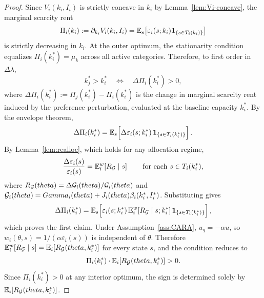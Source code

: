 \documentclass[master.tex]{subfiles}
\begin{document}
\begin{proof}
Since $V_i(k_i,I_i)$ is strictly concave in $k_i$ by Lemma~\ref{lem:Vi-concave}, the marginal scarcity rent
\[
\Pi_i(k_i):=\partial_{k_i}V_i(k_i,I_i)
=
\mathbb{E}_s\!\left[
\varepsilon_i(s;k_i)\mathbf{1}_{\{s\in T_i(k_i)\}}
\right]
\]
is strictly decreasing in $k_i$. At the outer optimum, the stationarity condition equalizes $\Pi_i(k_i^\ast)=\mu_k$ across all active categories. Therefore, to first order in $\Delta\lambda$,
\[
k_j^\ast>k_i^\ast
\quad\Longleftrightarrow\quad
\Delta \Pi_i(k_i^\ast)>0,
\]
where $\Delta \Pi_i(k_i^\ast):=\Pi_j(k_i^\ast)-\Pi_i(k_i^\ast)$ is the change in marginal scarcity rent induced by the preference perturbation, evaluated at the baseline capacity $k_i^\ast$. By the envelope theorem,
\[
\Delta \Pi_i(k_i^\ast)
=
\mathbb{E}_s\!\left[
\Delta \varepsilon_i(s;k_i^\ast)\,
\mathbf{1}_{\{s\in T_i(k_i^\ast)\}}
\right].
\]
By Lemma~\ref{lem:realloc}, which holds for any allocation regime,
\[
\frac{\Delta\varepsilon_i(s)}{\varepsilon_i(s)}
=
\mathbb{E}_i^w\!\left[R_{\mathcal{G}}\mid s\right]
\qquad
\text{for each } s\in T_i(k_i^\ast),
\]
where $R_{\mathcal{G}}(theta)=\Delta \mathcal{G}_i(theta)/\mathcal{G}_i(theta)$ and $\mathcal{G}_i(theta)=Gamma_i(theta)+J_i(theta)\beta_i(k_i^\ast,I_i^\ast)$. Substituting gives
\[
\Delta \Pi_i(k_i^\ast)
=
\mathbb{E}_s\!\left[
\varepsilon_i(s;k_i^\ast)\,
\mathbb{E}_i^w\!\left[R_{\mathcal{G}}\mid s;k_i^\ast\right]
\mathbf{1}_{\{s\in T_i(k_i^\ast)\}}
\right],
\]
which proves the first claim. Under Assumption~\ref{ass:CARA}, $u_q=-\alpha u$, so $w_i(\theta,s)=1/(\alpha\varepsilon_i(s))$ is independent of $\theta$. Therefore $\mathbb{E}_i^w[R_{\mathcal{G}}\mid s]=\mathbb{E}_i[R_{\mathcal{G}}(theta,k_i^\ast)]$ for every state $s$, and the condition reduces to
\[
\Pi_i(k_i^\ast)\cdot\mathbb{E}_i[R_{\mathcal{G}}(theta,k_i^\ast)]>0.
\]
Since $\Pi_i(k_i^\ast)>0$ at any interior optimum, the sign is determined solely by $\mathbb{E}_i[R_{\mathcal{G}}(theta,k_i^\ast)]$.
\end{proof}




\end{document}
